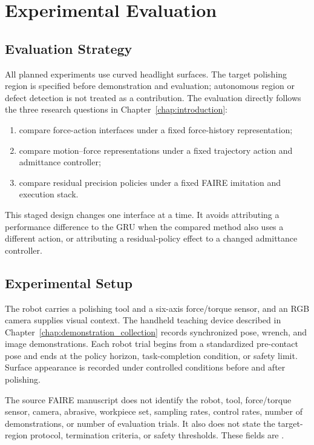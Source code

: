 \chapter{Experimental Evaluation}
\label{chap:experiments}

\section{Evaluation Strategy}
All planned experiments use curved headlight surfaces. The target polishing region is specified before demonstration and evaluation; autonomous region or defect detection is not treated as a contribution. The evaluation directly follows the three research questions in Chapter~\ref{chap:introduction}:
\begin{enumerate}
  \item compare force-action interfaces under a fixed force-history representation;
  \item compare motion--force representations under a fixed trajectory action and admittance controller;
  \item compare residual precision policies under a fixed FAIRE imitation and execution stack.
\end{enumerate}
This staged design changes one interface at a time. It avoids attributing a performance difference to the GRU when the compared method also uses a different action, or attributing a residual-policy effect to a changed admittance controller.

\section{Experimental Setup}
The robot carries a polishing tool and a six-axis force/torque sensor, and an RGB camera supplies visual context. The handheld teaching device described in Chapter~\ref{chap:demonstration_collection} records synchronized pose, wrench, and image demonstrations. Each robot trial begins from a standardized pre-contact pose and ends at the policy horizon, task-completion condition, or safety limit. Surface appearance is recorded under controlled conditions before and after polishing.

The source FAIRE manuscript does not identify the robot, tool, force/torque sensor, camera, abrasive, workpiece set, sampling rates, control rates, number of demonstrations, or number of evaluation trials. It also does not state the target-region protocol, termination criteria, or safety thresholds. These fields are .

